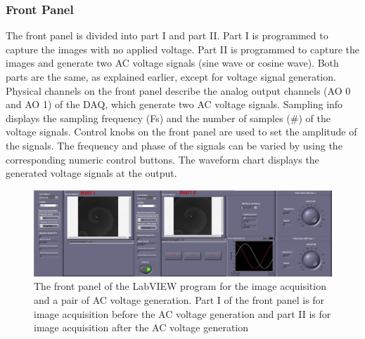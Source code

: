 \documentclass[journal=jacsat,manuscript=article]{achemso}
\begin{document}
\subsubsection{Front Panel}
The front panel is divided into part I and part II. Part I is programmed to capture the images with no applied voltage.  Part II is programmed to capture the images and generate two AC voltage signals (sine wave or cosine wave). Both parts are the same, as explained earlier, except for voltage signal generation. Physical channels on the front panel describe the analog output channels (AO 0 and AO 1) of the DAQ, which generate two AC voltage signals. Sampling info displays the sampling frequency (Fs) and the number of samples (\#) of the voltage signals. Control knobs on the front panel are used to set the amplitude of the signals. The frequency and phase of the signals can be varied by using the corresponding numeric control buttons. The waveform chart displays the generated voltage signals at the output.
\begin{figure}[H]
    \centering
    \includegraphics[width=\linewidth,height=0.6\linewidth]{polarised - Copy.png}
    \caption{The front panel of the LabVIEW program for the image acquisition and a pair of  AC voltage
 generation. Part I of the front panel is for image acquisition before the AC voltage generation
and part II is for image acquisition after the AC voltage generation}
    \label{fig:ex7}
\end{figure}
\end{document}

